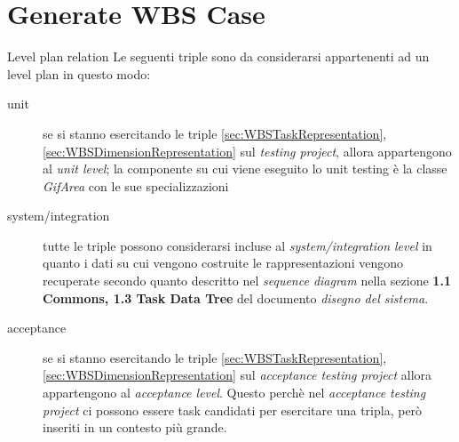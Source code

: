 \chapter{Generate WBS Case}
\label{chap:generateWBS}

\begin{paragraph}{Level plan relation}
Le seguenti triple sono da considerarsi appartenenti ad un level plan in questo
modo:
\begin{description}
\item[unit] se si stanno esercitando le triple
\ref{sec:WBSTaskRepresentation},  \ref{sec:WBSDimensionRepresentation} sul
\emph{testing project}, allora appartengono al \emph{unit level};  la
componente su cui viene eseguito lo unit testing \`e la classe  \emph{GifArea}
con le sue specializzazioni
  \item[system/integration] tutte le triple possono considerarsi incluse al
  \emph{system/integration level} in quanto i dati su cui vengono costruite le
  rappresentazioni vengono recuperate secondo quanto descritto nel
  \emph{sequence diagram} nella sezione \textbf{1.1 Commons, 1.3 Task Data
  Tree}  del documento \emph{disegno del sistema}.
  \item[acceptance] se si stanno esercitando le triple
  \ref{sec:WBSTaskRepresentation}, \ref{sec:WBSDimensionRepresentation} sul 
  \emph{acceptance testing project} allora appartengono al  \emph{acceptance
  level}. Questo perch\`e nel \emph{acceptance testing project} ci possono 
  essere task candidati per esercitare una tripla, per\`o inseriti in un 
  contesto pi\`u grande.
\end{description}
\end{paragraph}

